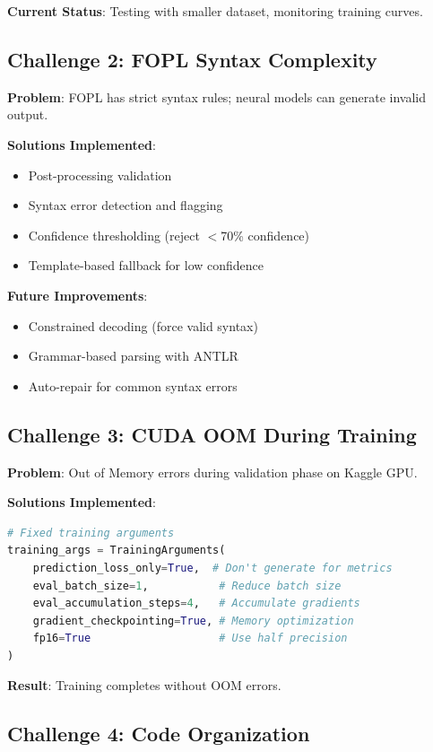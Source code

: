 \documentclass[12pt,a4paper]{article}
\begin{document}
\textbf{Current Status}: Testing with smaller dataset, monitoring training curves.

\subsection{Challenge 2: FOPL Syntax Complexity}

\textbf{Problem}: FOPL has strict syntax rules; neural models can generate invalid output.

\textbf{Solutions Implemented}:
\begin{itemize}
    \item Post-processing validation
    \item Syntax error detection and flagging
    \item Confidence thresholding (reject $<$70\% confidence)
    \item Template-based fallback for low confidence
\end{itemize}

\textbf{Future Improvements}:
\begin{itemize}
    \item Constrained decoding (force valid syntax)
    \item Grammar-based parsing with ANTLR
    \item Auto-repair for common syntax errors
\end{itemize}

\subsection{Challenge 3: CUDA OOM During Training}

\textbf{Problem}: Out of Memory errors during validation phase on Kaggle GPU.

\textbf{Solutions Implemented}:
\begin{lstlisting}[language=Python]
# Fixed training arguments
training_args = TrainingArguments(
    prediction_loss_only=True,  # Don't generate for metrics
    eval_batch_size=1,           # Reduce batch size
    eval_accumulation_steps=4,   # Accumulate gradients
    gradient_checkpointing=True, # Memory optimization
    fp16=True                    # Use half precision
)
\end{lstlisting}

\textbf{Result}: Training completes without OOM errors.

\subsection{Challenge 4: Code Organization}
\end{document}
